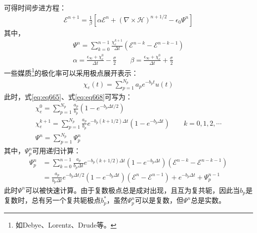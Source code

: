 \documentclass{article}
\numberwithin{equation}{section}
\renewcommand{\vec}[1]{\boldsymbol{#1}}
\begin{document}
可得时间步进方程：
\begin{align}
    \label{eq:eq667}
    \vec{\mathcal{E}}^{n+1}=\frac{1}{\beta}\left[\alpha\vec{\mathcal{E}}^{n}+(\nabla\times\vec{\mathcal{H}})^{n+1/2}-\epsilon_0\vec{\varPsi}^n\right]
\end{align}
其中，
\begin{align}
    \label{eq:eq668}
    \vec{\varPsi}^n=\sum_{k=0}^{n-1}\frac{\chi_e^{k+1}}{\Delta t}(\vec{\mathcal{E}}^{n-k}-\vec{\mathcal{E}}^{n-k-1}) \\
    \label{eq:eq669}
    \alpha=\frac{\epsilon_{\infty}+\chi_e^0}{\Delta t}-\frac{\sigma}{2}\qquad\beta=\frac{\epsilon_{\infty}+\chi_e^0}{\Delta t}+\frac{\sigma}{2}
\end{align}
一些媒质\footnote{如Debye、Lorentz、Drude等。}的极化率可以采用极点展开表示：
\begin{align}
    \label{eq:eq670}
    \chi_e(t)=\sum_{p=1}^{N_p}a_pe^{-b_pt}u(t)
\end{align}
此时，式\ref{eq:eq665}、式\ref{eq:eq668}可写为：
\begin{align}
    \label{eq:eq671}
    \chi_e^0=\sum_{p=1}^{N_p}\frac{a_p}{b_p}(1-e^{-b_p\Delta t/2}) \\
    \label{eq:eq672}
    \chi_e^{k+1}=\sum_{p=1}^{N_p}\frac{a_p}{b_p}e^{-b_p(k+1/2)\Delta t}(1-e^{-b_p\Delta t})\qquad k=0,1,2,\cdots \\
    \label{eq:eq673}
    \vec{\varPsi}^n=\sum_{p=1}^{N_p}\vec{\varPsi}_p^n
\end{align}
其中，$\vec{\varPsi}_p^n$可用递归计算：
\begin{align}
    \label{eq:eq674}
    \vec{\varPsi}_p^n&=\sum_{k=0}^{n-1}\frac{a_p}{b_p\Delta t}e^{-b_p(k+1/2)\Delta t}(1-e^{-b_p\Delta t})(\vec{\mathcal{E}}^{n-k}-\vec{\mathcal{E}}^{n-k-1}) \nonumber \\
                     &=\frac{a_p}{b_p\Delta t}e^{-b_p\Delta t/2}(1-e^{-b_p\Delta t})(\vec{\mathcal{E}}^{n}-\vec{\mathcal{E}}^{n-1})+e^{-b_p\Delta t}+\vec{\varPsi}_p^{n-1}
\end{align}
此时$\vec{\varPsi}^n$可以被快速计算。由于复数极点总是成对出现，且互为复共轭，因此当$b_p$是复数时，总有另一个复共轭极点$b_p^*$，虽然$\vec{\varPsi}_p^n$可以是复数，但$\vec{\varPsi}^n$总是实数。
\end{document}
